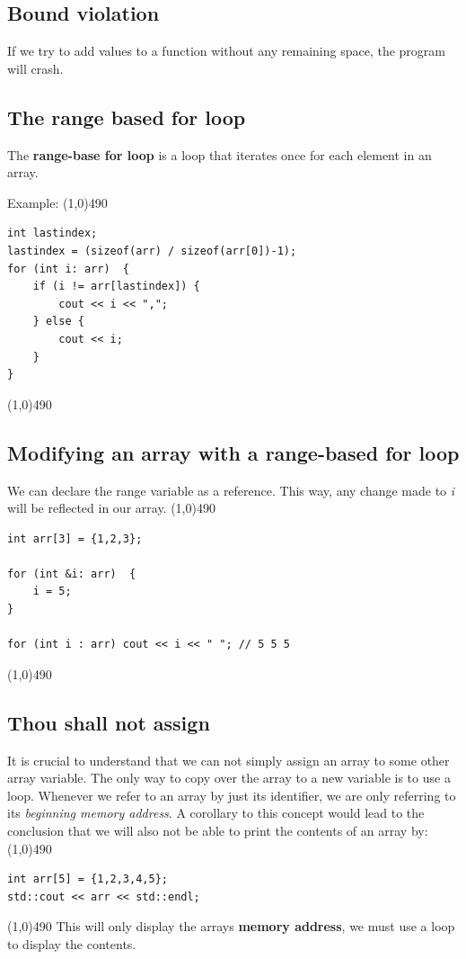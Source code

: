 \documentclass{report}
\begin{document}
   \bigbreak \noindent 
   \subsection{Bound violation}
   \bigbreak \noindent 
   If we try to add values to a function without any remaining space, the program will crash.

   \pagebreak \bigbreak \noindent 
   \subsection{The range based for loop}
   \bigbreak \noindent 
   \begin{concept}
 The \textbf{range-base for loop} is a loop that iterates once for each element in an array.
	\end{concept}
   \bigbreak \noindent 
   Example:
   \bigbreak \noindent 
   \line(1,0){490}
    \begin{verbatim}
int lastindex;
lastindex = (sizeof(arr) / sizeof(arr[0])-1);
for (int i: arr)  {
    if (i != arr[lastindex]) {
        cout << i << ",";
    } else {
        cout << i;
    }
}
   \end{verbatim}
   \line(1,0){490}

   \subsection{Modifying an array with a range-based for loop}
   \bigbreak \noindent 
   We can declare the range variable as a reference. This way, any change made to \textit{i} will be reflected in our array.
   \bigbreak \noindent 
   \line(1,0){490}
   \begin{verbatim}
int arr[3] = {1,2,3};

for (int &i: arr)  {
    i = 5;
}

for (int i : arr) cout << i << " "; // 5 5 5
   \end{verbatim}
   \line(1,0){490}

   \bigbreak \noindent 
   \subsection{Thou shall not assign}
   \bigbreak \noindent 
   It is crucial to understand  that we can not simply assign an array to some other array variable. The only way to copy over the array to a new variable is to use a loop. Whenever we refer to an array by just its identifier, we are only referring to its \textit{beginning memory address}.
   \bigbreak \noindent 
   A corollary to this concept would lead to the conclusion that we will also not be able to print the contents of an array by:
   \bigbreak \noindent 
   \line(1,0){490}
   \begin{verbatim}
int arr[5] = {1,2,3,4,5};
std::cout << arr << std::endl;

   \end{verbatim}
   \line(1,0){490}
   \bigbreak \noindent 
   This will only display the arrays \textbf{memory address}, we must use a loop to display the contents.
\end{document}
